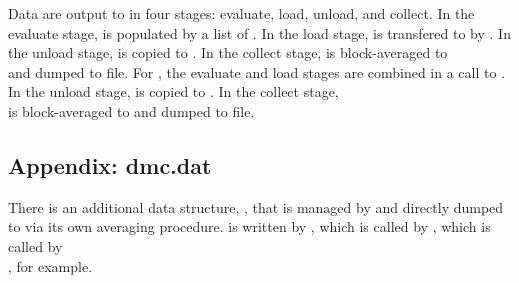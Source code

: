 Data are output to  in four stages: evaluate, load, unload, and collect. In the evaluate stage,  is populated by a list of . In the load stage,  is transfered to  by . In the unload stage,  is copied to . In the collect stage,  is block-averaged to \\  and dumped to file. For , the evaluate and load stages are combined in a call to . In the unload stage,  is copied to . In the collect stage, \\  is block-averaged to  and dumped to file.

\subsection{Appendix: dmc.dat}

\begin{sloppypar}
There is an additional data structure, , that is managed by  and directly dumped to  via its own averaging procedure.  is written by , which is called by , which is called by \\ , for example.
\end{sloppypar}